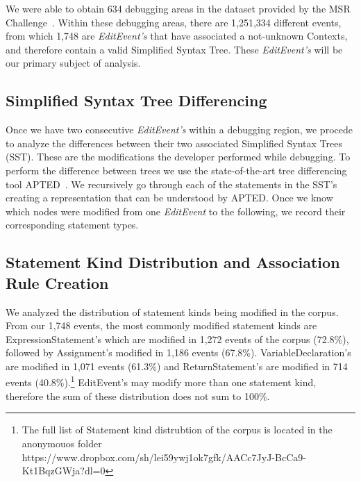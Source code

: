 \documentclass[sigconf]{acmart}
\begin{document}
We were able to obtain 634 debugging areas in the dataset 
provided by the MSR Challenge~\cite{msr18challenge}.
Within these debugging areas, there are 1,251,334
different events, from which 1,748 are \textit{EditEvent's}
that have associated a not-unknown Contexts, and therefore 
contain a valid Simplified Syntax Tree. These \textit{EditEvent's} 
will be our primary subject of analysis.

\subsection{Simplified Syntax Tree Differencing}
\label{sstDiff}
Once we have two consecutive \textit{EditEvent's} within
a debugging region, we procede to analyze the differences
between their two associated Simplified Syntax Trees (SST).
These are the modifications the developer performed
while debugging.
To perform the difference between trees we use the 
state-of-the-art tree differencing
tool APTED~\cite{Pawlik16Apted}.
We recursively go through each of the statements in the 
SST's creating a representation that can be understood by
APTED. 
Once we know which nodes were modified from one \textit{EditEvent}
to the following, we record their corresponding statement types.

\subsection{Statement Kind Distribution and Association Rule Creation}

We analyzed the distribution of statement kinds being modified
in the corpus.
From our 1,748 events, the most commonly modified statement
kinds are ExpressionStatement's which are modified in 1,272 
events of
the corpus (72.8\%), followed by Assignment's modified in 1,186
events (67.8\%). VariableDeclaration's are modified in 1,071
events (61.3\%) and ReturnStatement's are modified in 714
events (40.8\%).\footnote{The full list of Statement kind
distrubtion of the corpus is located in the anonymouos folder 
https://www.dropbox.com/sh/lei59ywj1ok7gfk/AACc7JyJ-BcCa9-Kt1BqzGWja?dl=0} 
EditEvent's may modify more than one
statement kind, therefore the sum of these distribution
does not sum to 100\%.



\end{document}
